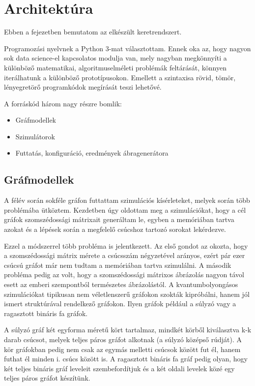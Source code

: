 \chapter{Architektúra}

Ebben a fejezetben bemutatom az elkészült keretrendszert.

Programozási nyelvnek a Python 3-mat választottam. Ennek oka az, hogy nagyon
sok data science-el kapcsolatos modulja van, mely nagyban megkönnyíti a
különböző matematikai, algoritmuselméleti problémák feltárását, könnyen
iterálhatunk a különböző prototípusokon. Emellett a szintaxisa rövid, tömör,
lényegretörő programkódok megírását teszi lehetővé.

A forráskód három nagy részre bomlik:
\begin{itemize}
  \item Gráfmodellek
  \item Szimulátorok
  \item Futtatás, konfiguráció, eredmények ábragenerátora
\end{itemize}

\section{Gráfmodellek}

A félév során sokféle gráfon futtattam szimulációs kísérleteket, melyek során
több problémába ütköztem. Kezdetben úgy oldottam meg a szimulációkat, hogy a
cél gráfok szomszédossági mátrixait generáltam le, egyben a memóriában tartva
azokat és a lépések során a megfelelő csúcshoz tartozó sorokat lekérdezve.

Ezzel a módszerrel több probléma is jelentkezett. Az első gondot az okozta,
hogy a szomszédossági mátrix mérete a csúcsszám négyzetével arányos, ezért pár
ezer csúcsú gráfot már nem tudtam a memóriában tartva szimulálni. A második
probléma pedig az volt, hogy a szomszédossági mátrixos ábrázolás nagyon távol
esett az emberi szempontból természetes ábrázolástól. A kvantumbolyongásos
szimulációkat tipikusan nem véletlenszerű gráfokon szokták kipróbálni, hanem
jól ismert struktúrával rendelkező gráfokon. Ilyen gráfok például a súlyzó vagy
a ragasztott bináris fa gráfok.

A súlyzó gráf két egyforma méretű kört tartalmaz, mindkét körből kiválasztva
k-k darab csúcsot, melyek teljes páros gráfot alkotnak (a súlyzó középső
rúdját). A kör gráfokban pedig nem csak az egymás melletti csúcsok között fut
él, hanem futhat él minden i. csúcs között is. A ragasztott bináris fa gráf
pedig olyan, hogy két teljes bináris gráf leveleit szembefordítjuk és a két
oldali levelek közé egy teljes páros gráfot készítünk.

